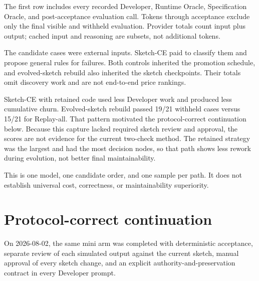 The first row includes every recorded Developer, Runtime Oracle, Specification Oracle, and
post-acceptance evaluation call. Tokens through acceptance exclude only the final visible and
withheld evaluation. Provider totals count input plus output; cached input and reasoning are
subsets, not additional tokens.

The candidate cases were external inputs. Sketch-CE paid to classify them and propose general
rules for failures. Both controls inherited the promotion schedule, and evolved-sketch rebuild
also inherited the sketch checkpoints. Their totals omit discovery work and are not end-to-end
price rankings.

Sketch-CE with retained code used less Developer work and produced less cumulative churn.
Evolved-sketch rebuild passed 19/21 withheld cases versus 15/21 for Replay-all. That pattern
motivated the protocol-correct continuation below. Because this capture lacked required sketch
review and approval, the scores are not evidence for the current two-check method. The retained
strategy was the largest and had the most decision nodes, so that path shows less rework during
evolution, not better final maintainability.

This is one model, one candidate order, and one sample per path. It does not establish universal
cost, correctness, or maintainability superiority.

\section{Protocol-correct continuation}\label{protocol-correct-continuation}

On 2026-08-02, the same mini arm was completed with deterministic acceptance, separate review of
each simulated output against the current sketch, manual approval of every sketch change, and an
explicit authority-and-preservation contract in every Developer prompt.


